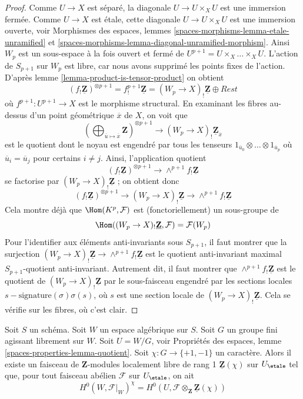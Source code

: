 \begin{proof}
Comme $U \to X$ est séparé, la diagonale $U \to U \times_X U$ est une
immersion fermée. Comme $U \to X$ est étale, cette diagonale
$U \to U \times_X U$ est une immersion ouverte, voir
Morphismes des espaces, lemmes
\ref{spaces-morphisms-lemma-etale-unramified} et
\ref{spaces-morphisms-lemma-diagonal-unramified-morphism}.
Ainsi $W_p$ est un sous-espace à la fois ouvert et fermé de
$U^{p + 1} = U \times_X \ldots \times_X U$. L'action de $S_{p + 1}$
sur $W_p$ est libre, car nous avons supprimé les points fixes de l'action.
D'après
lemme \ref{lemma-product-is-tensor-product}
on obtient
$$
(f_!\underline{\mathbf{Z}})^{\otimes p + 1} =
f^{p + 1}_!\underline{\mathbf{Z}} = (W_p \to X)_!\underline{\mathbf{Z}}
\oplus Rest
$$
où $f^{p + 1} : U^{p + 1} \to X$ est le morphisme structural.
En examinant les fibres au-dessus d'un point géométrique $\overline{x}$ de $X$,
on voit que
$$
\left(
\bigoplus\nolimits_{\overline{u} \mapsto \overline{x}} \mathbf{Z}
\right)^{\otimes p + 1}
\longrightarrow
(W_p \to X)_!\underline{\mathbf{Z}}_{\overline{x}}
$$
est le quotient dont le noyau est engendré par tous les tenseurs
$1_{\overline{u}_0} \otimes \ldots \otimes 1_{\overline{u}_p}$
où $\overline{u}_i = \overline{u}_j$ pour certains $i \not = j$.
Ainsi, l'application quotient
$$
(f_!\underline{\mathbf{Z}})^{\otimes p + 1}
\longrightarrow
\wedge^{p + 1}f_!\underline{\mathbf{Z}}
$$
se factorise par $(W_p \to X)_!\underline{\mathbf{Z}}$ ; on obtient donc
$$
(f_!\underline{\mathbf{Z}})^{\otimes p + 1}
\longrightarrow
(W_p \to X)_!\underline{\mathbf{Z}}
\longrightarrow
\wedge^{p + 1}f_!\underline{\mathbf{Z}}
$$
Cela montre déjà que $\Hom(K^p, \mathcal{F})$ est (fonctoriellement) un
sous-groupe de
$$
\Hom((W_p \to X)_!\underline{\mathbf{Z}}, \mathcal{F}) = \mathcal{F}(W_p)
$$
Pour l'identifier aux éléments anti-invariants sous $S_{p + 1}$, il faut montrer que
la surjection $(W_p \to X)_!\underline{\mathbf{Z}}
\to \wedge^{p + 1}f_!\underline{\mathbf{Z}}$ est le quotient anti-invariant maximal
$S_{p + 1}$-quotient anti-invariant. Autrement dit, il faut montrer que
$\wedge^{p + 1}f_!\underline{\mathbf{Z}}$ est le quotient de
$(W_p \to X)_!\underline{\mathbf{Z}}$ par le sous-faisceau engendré par
les sections locales $s - \text{signature}(\sigma)\sigma(s)$, où $s$ est
une section locale de $(W_p \to X)_!\underline{\mathbf{Z}}$.
Cela se vérifie sur les fibres, où c'est clair.
\end{proof}

\begin{lemma}
\label{lemma-twist}
Soit $S$ un schéma. Soit $W$ un espace algébrique sur $S$.
Soit $G$ un groupe fini agissant librement sur $W$.
Soit $U = W/G$, voir
Propriétés des espaces, lemme \ref{spaces-properties-lemma-quotient}.
Soit $\chi : G \to \{+1, -1\}$ un caractère.
Alors il existe un faisceau de $\mathbf{Z}$-modules localement libre de rang 1
$\underline{\mathbf{Z}}(\chi)$ sur $U_\etale$ tel que, pour tout
faisceau abélien $\mathcal{F}$ sur $U_\etale$, on ait
$$
H^0(W, \mathcal{F}|_W)^\chi =
H^0(U, \mathcal{F} \otimes_{\mathbf{Z}} \underline{\mathbf{Z}}(\chi))
$$
\end{lemma}

